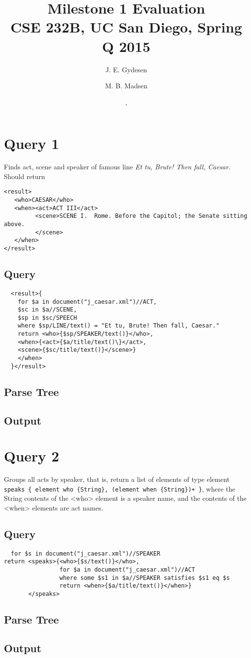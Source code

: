 \documentclass{article}
\title{Milestone 1 Evaluation\\
{\small CSE 232B, UC San Diego, Spring Q 2015}}
\author{J. E. Gydesen \and
        M. B. Madsen}
\date{\DTMdisplaydate{2015}{5}{13}{3}, \DTMdisplaytime{11}{10}{00}}
\begin{document}
\maketitle

\section{Query 1}
Finds act, scene and speaker of famous line \emph{Et tu, Brute! Then fall, Caesar}. Should return 

\begin{verbatim}
<result>
   <who>CAESAR</who>
   <when><act>ACT III</act>
         <scene>SCENE I.  Rome. Before the Capitol; the Senate sitting above.
         </scene>
   </when>
</result>
\end{verbatim}

\subsection{Query}
\begin{verbatim}
  <result>{
    for $a in document("j_caesar.xml")//ACT,
    $sc in $a//SCENE,
    $sp in $sc/SPEECH
    where $sp/LINE/text() = "Et tu, Brute! Then fall, Caesar."
    return <who>{$sp/SPEAKER/text()}</who>,
    <when>{<act>{$a/title/text()\}</act>,
    <scene>{$sc/title/text()}</scene>}
    </when>
  }</result>
\end{verbatim}

\subsection{Parse Tree}
\subsection{Output}

\section{Query 2}
Groups all acts by speaker, that is, return a list of elements of type element  \texttt{speaks \{ element who \{String\}, (element when \{String\})+ \}}, where the String contents of the <who> element is a speaker name, and the contents of the <when> elements are act names.

\subsection{Query}
\begin{verbatim}
  for $s in document("j_caesar.xml")//SPEAKER
return <speaks>{<who>{$s/text()}</who>,
                for $a in document("j_caesar.xml")//ACT
                where some $s1 in $a//SPEAKER satisfies $s1 eq $s
                return <when>{$a/title/text()}</when>}
       </speaks>
\end{verbatim}

\subsection{Parse Tree}
\subsection{Output}
\end{document}
